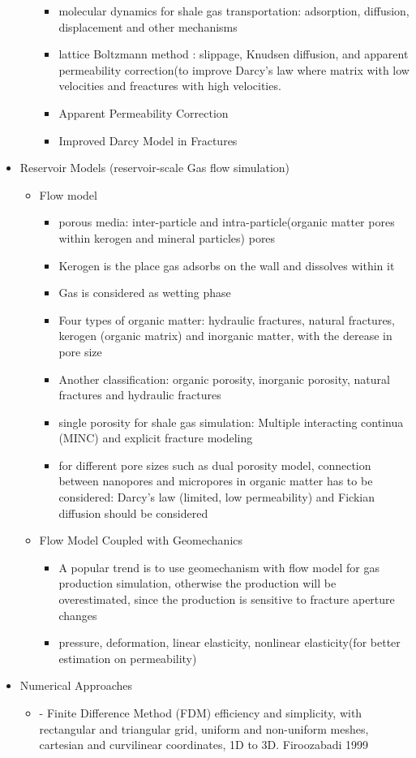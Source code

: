 \begin{itemize}
\begin{itemize}
\begin{itemize}
\item molecular dynamics for shale gas transportation: adsorption, diffusion, displacement and other mechanisms
\item lattice Boltzmann method : slippage, Knudsen diffusion, and apparent permeability correction(to improve Darcy’s law where matrix with low velocities and freactures with high velocities.
\item Apparent Permeability Correction
\item Improved Darcy Model in Fractures
\end{itemize}
\end{itemize}
\item Reservoir Models (reservoir-scale Gas flow  simulation)
\begin{itemize}
\item Flow model
\begin{itemize}
\item porous media: inter-particle and intra-particle(organic matter pores within kerogen and mineral particles) pores
\item Kerogen is the place gas adsorbs on the wall and dissolves within it
\item Gas is considered as wetting phase
\item Four types of organic matter: hydraulic fractures, natural fractures, kerogen (organic matrix) and inorganic matter, with the derease in pore size
\item Another classification: organic porosity, inorganic porosity, natural fractures and hydraulic fractures
\item single porosity for shale gas simulation: Multiple interacting continua (MINC) and explicit fracture modeling
\item for different pore sizes such as dual porosity model, connection between nanopores and micropores in organic matter has to be considered: Darcy’s law (limited, low permeability) and Fickian diffusion should be considered
\end{itemize}
\item Flow Model Coupled with Geomechanics
\begin{itemize}
\item A popular trend is to use geomechanism with flow model for gas production simulation, otherwise the production will be overestimated, since the production is sensitive to fracture aperture changes
\item pressure, deformation, linear elasticity, nonlinear elasticity(for better estimation on permeability)
\end{itemize}
\end{itemize}
\item Numerical Approaches
\begin{itemize}
\item - Finite Difference Method (FDM)
efficiency and simplicity, with rectangular and triangular grid, uniform and non-uniform meshes, cartesian and curvilinear coordinates, 1D to 3D.  Firoozabadi 1999
 

\end{itemize}
\end{itemize}
